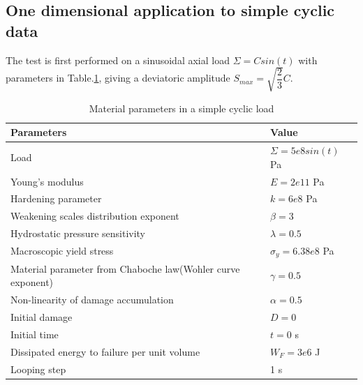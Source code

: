 \documentclass[3p,times,number,review]{elsarticle}
\begin{document}
\subsection{One dimensional application to simple cyclic data}
The test is first performed on a sinusoidal axial load $\Sigma=Csin(t)$ with parameters in Table.\ref{Sin}, giving a deviatoric amplitude $S_{max}=\sqrt{\dfrac{2}{3}}C$.
\begin{table}[!h]
	\centering
	\begin{tabular}{ll}
		\hline
		\textbf{Parameters}                                         & \textbf{Value}                    \\ \hline
		Load                                                              & $\Sigma=5e8sin(t)$ Pa                  \\
		Young's modulus                                             & $E=2e11$ Pa                       \\
		Hardening parameter                                         &  $k=6e8$ Pa \\
		Weakening scales distribution exponent                      & $\beta=3$                             \\
		Hydrostatic pressure sensitivity                            & $\lambda=0.5$                     \\
		Macroscopic yield stress                                    & $\sigma_y=6.38e8$ Pa              \\
		Material parameter from Chaboche law(Wohler curve exponent) & $\gamma=0.5$                        \\
		Non-linearity of damage accumulation & $\alpha=0.5$                        \\
		Initial damage                                              & $D=0$                          \\
		Initial time                                                & $t=0$ s                            \\
		Dissipated energy to failure per unit volume                & $W_F=3e6$ J                       \\
		Looping step                                           & 1 s              \\ \hline
	\end{tabular}
		\caption{Material parameters in a simple cyclic load }
		\label{Sin}
\end{table}
\end{document}
